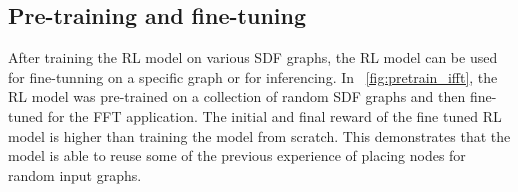 \subsection{Pre-training and fine-tuning}
After training the RL model on various SDF graphs, the RL model can be used for fine-tunning on a specific graph or for inferencing.
In \figurename~\ref{fig:pretrain_ifft}, the RL model was pre-trained on a collection of random SDF graphs and then fine-tuned for the FFT application.
The initial and final reward of the fine tuned RL model is higher than training the model from scratch.
This demonstrates that the model is able to reuse some of the previous experience of placing nodes for random input graphs.